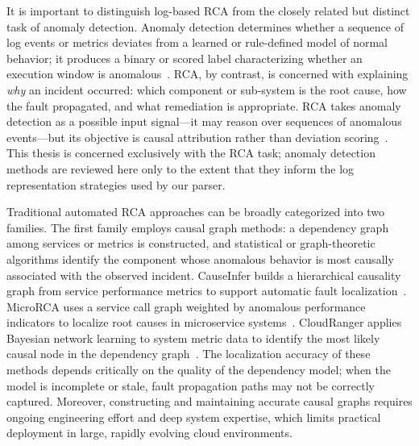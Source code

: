It is important to distinguish log-based RCA from the closely related but distinct task of anomaly
detection. Anomaly detection determines whether a sequence of log events or metrics deviates from
a learned or rule-defined model of normal behavior; it produces a binary or scored label
characterizing whether an execution window is anomalous~\cite{du2017deeplog,zhang2019logrobust}.
RCA, by contrast, is concerned with explaining \emph{why} an incident occurred: which component or
sub-system is the root cause, how the fault propagated, and what remediation is appropriate.
RCA takes anomaly detection as a possible input signal---it may reason over sequences of anomalous
events---but its objective is causal attribution rather than deviation
scoring~\cite{meng2020localizing,wu2020microrca}. This thesis is concerned exclusively with the
RCA task; anomaly detection methods are reviewed here only to the extent that they inform the log
representation strategies used by our parser.

Traditional automated RCA approaches can be broadly categorized into two families. The first family
employs causal graph methods: a dependency graph among services or metrics is constructed, and
statistical or graph-theoretic algorithms identify the component whose anomalous behavior is most
causally associated with the observed incident. CauseInfer builds a hierarchical causality graph
from service performance metrics to support automatic fault
localization~\cite{chen2014causeinfer}. MicroRCA uses a service call graph weighted by anomalous
performance indicators to localize root causes in microservice
systems~\cite{wu2020microrca}. CloudRanger applies Bayesian network learning to system metric
data to identify the most likely causal node in the dependency
graph~\cite{wang2018cloudranger}. The localization accuracy of these methods depends critically
on the quality of the dependency model; when the model is incomplete or stale, fault propagation
paths may not be correctly captured. Moreover, constructing and maintaining accurate causal graphs
requires ongoing engineering effort and deep system expertise, which limits practical deployment
in large, rapidly evolving cloud environments.

